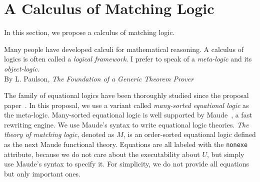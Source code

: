 \documentclass[UTF8]{article}
\theoremstyle{plain}
\theoremstyle{definition}
\theoremstyle{remark}
\begin{document}
\section{A Calculus of Matching Logic}
In this section, we propose a calculus of matching logic.
\begin{displayquote}
	Many people have developed calculi for mathematical reasoning. 
	A calculus of logics is often called a \emph{logical framework}.
	I prefer to speak of a \emph{meta-logic} and its \emph{object-logic}. \\
	By L. Paulson, \emph{The Foundation of a Generic Theorem Prover}
\end{displayquote}

The family of equational logics have been thoroughly studied since the proposal 
paper~\cite{}.
In this proposal, we use a variant called \emph{many-sorted equational logic} 
as the meta-logic. 
Many-sorted equational logic is well supported by Maude~\cite{}, a fast 
rewriting engine. 
We use Maude's syntax to write equational logic theories. 
\emph{The theory of matching logic}, denoted as $M$, is an order-sorted 
equational logic defined as the next Maude functional theory.
Equations are all labeled with the \texttt{nonexe} attribute, because we do not 
care about the executability about $U$, but simply use Maude's syntax to 
specify it. 
For simplicity, we do not provide all equations but only important ones. 
\end{document}
